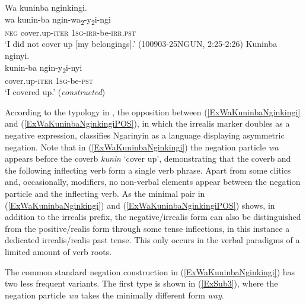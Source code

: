 \documentclass[output=paper,colorlinks,citecolor=brown]{langscibook}
\begin{document}
\begin{exe}
\ex
\begin{xlist}
\ex \label{ExWaKuninbaNginkingi}
    \glll Wa kuninba nginkingi.\\
    wa kunin-ba ngin-wa\textsubscript{2}-y\textsubscript{2}i-ngi\\
    \textsc{neg} cover.up-\textsc{iter} 1\textsc{sg}-\textsc{irr}-be-\textsc{irr.pst}\\
    \glt `I did not cover up [my belongings].' (100903-25NGUN, 2:25-2:26)
\ex \label{ExWaKuninbaNginkingiPOS} 
    \glll Kuninba nginyi.\\
    kunin-ba ngin-y\textsubscript{2}i-nyi\\
    cover.up-\textsc{iter} 1\textsc{sg}-be-\textsc{pst}\\
    \glt `I covered up.' (\textit{constructed})
\end{xlist}
\end{exe}

According to the typology in \citet{Miestamo2013-wals113}, the opposition between (\ref{ExWaKuninbaNginkingi} and (\ref{ExWaKuninbaNginkingiPOS}), in which the irrealis marker doubles as a negative expression, classifies Ngarinyin as a language displaying asymmetric negation. Note that in (\ref{ExWaKuninbaNginkingi}) the negation particle \textit{wa} appears before the coverb \textit{kunin} `cover up', demonstrating that the coverb and the following inflecting verb form a single verb phrase. Apart from some clitics and, occasionally, modifiers, no non-verbal elements appear between the negation particle and the inflecting verb. As the minimal pair in (\ref{ExWaKuninbaNginkingi}) and (\ref{ExWaKuninbaNginkingiPOS}) shows, in addition to the irrealis prefix, the negative/irrealis form can also be distinguished from the positive/realis form through some tense inflections, in this instance a dedicated irrealis/realis past tense. This only occurs in the verbal paradigms of a limited amount of verb roots.

The common standard negation construction in (\ref{ExWaKuninbaNginkingi}) has two less frequent variants. The first type is shown in (\ref{ExSub3}), where the negation particle \textit{wa} takes the minimally different form \textit{way}.


\end{document}
